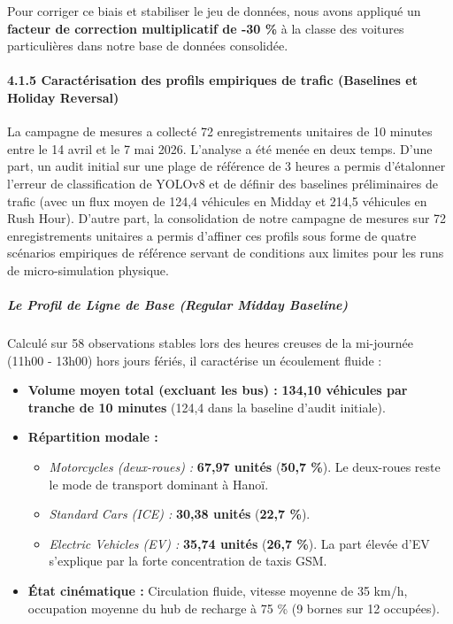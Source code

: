 \documentclass[10pt, a4paper]{article}
\providecommand{\tightlist}{}
\begin{document}
Pour corriger ce biais et stabiliser le jeu de données, nous avons
appliqué un \textbf{facteur de correction multiplicatif de -30 \%} à la
classe des voitures particulières dans notre base de données consolidée.

\paragraph{4.1.5 Caractérisation des profils empiriques de trafic
(Baselines et Holiday
Reversal)}\label{caractuxe9risation-des-profils-empiriques-de-trafic-baselines-et-holiday-reversal}

La campagne de mesures a collecté 72 enregistrements unitaires de 10
minutes entre le 14 avril et le 7 mai 2026. L'analyse a été menée en
deux temps. D'une part, un audit initial sur une plage de référence de 3
heures a permis d'étalonner l'erreur de classification de YOLOv8 et de
définir des baselines préliminaires de trafic (avec un flux moyen de
124,4 véhicules en Midday et 214,5 véhicules en Rush Hour). D'autre
part, la consolidation de notre campagne de mesures sur 72
enregistrements unitaires a permis d'affiner ces profils sous forme de
quatre scénarios empiriques de référence servant de conditions aux
limites pour les runs de micro-simulation physique.

\subparagraph{Le Profil de Ligne de Base (Regular Midday
Baseline)}\label{le-profil-de-ligne-de-base-regular-midday-baseline}

Calculé sur 58 observations stables lors des heures creuses de la
mi-journée (11h00 - 13h00) hors jours fériés, il caractérise un
écoulement fluide :

\begin{itemize}
\tightlist
\item
  \textbf{Volume moyen total (excluant les bus) :} \textbf{134,10
  véhicules par tranche de 10 minutes} (124,4 dans la baseline d'audit
  initiale).
\item
  \textbf{Répartition modale :}

  \begin{itemize}
  \tightlist
  \item
    \emph{Motorcycles (deux-roues) :} \textbf{67,97 unités}
    (\textbf{50,7 \%}). Le deux-roues reste le mode de transport
    dominant à Hanoï.
  \item
    \emph{Standard Cars (ICE) :} \textbf{30,38 unités} (\textbf{22,7
    \%}).
  \item
    \emph{Electric Vehicles (EV) :} \textbf{35,74 unités} (\textbf{26,7
    \%}). La part élevée d'EV s'explique par la forte concentration de
    taxis GSM.
  \end{itemize}
\item
  \textbf{État cinématique :} Circulation fluide, vitesse moyenne de 35
  km/h, occupation moyenne du hub de recharge à 75 \% (9 bornes sur 12
  occupées).
\end{itemize}
\end{document}
